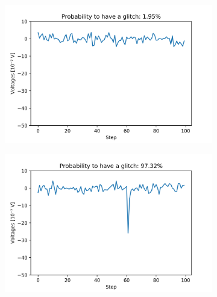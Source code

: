 \documentclass[12pt,a4paper,final]{report}			%
\begin{document}
\begin{figure}[h!]
				\centering
				\begin{subfigure}[t]{0.8\textwidth}		
				\centering		
					\includegraphics[scale=0.7]{../test_plots/plot_1.png}
				\end{subfigure}			

				\begin{subfigure}[t]{0.8\textwidth}				
				\centering
					\includegraphics[scale=0.7]{../test_plots/plot_10.png}
				\end{subfigure}		
				\caption{}
				\label{only_figure}
				
	\end{figure}
\end{document}
